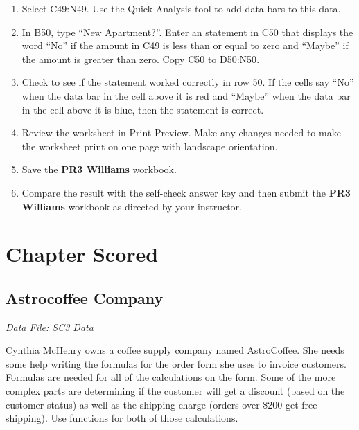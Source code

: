 \begin{enumerate}
	\item Select \textsf{C49:N49}. Use the Quick Analysis tool to add data bars to this data.
	\item In \textsf{B50}, type ``New Apartment?''. Enter an  statement in \textsf{C50} that displays the word ``No'' if the amount in \textsf{C49} is less than or equal to zero and ``Maybe'' if the amount is greater than zero. Copy \textsf{C50} to \textsf{D50:N50}.
	\item Check to see if the  statement worked correctly in row \textsf{50}. If the cells say ``No'' when the data bar in the cell above it is red and ``Maybe'' when the data bar in the cell above it is blue, then the  statement is correct.
	\item Review the worksheet in Print Preview. Make any changes needed to make the worksheet print on one page with landscape orientation.
	\item Save the \textbf{PR3 Williams} workbook.
	\item Compare the result with the self-check answer key and then submit the \textbf{PR3 Williams} workbook as directed by your instructor.
\end{enumerate}

\section{Chapter Scored}

\subsection{Astrocoffee Company}

\textit{Data File: SC3 Data}

Cynthia McHenry owns a coffee supply company named AstroCoffee. She needs some help writing the formulas for the order form she uses to invoice customers. Formulas are needed for all of the calculations on the form. Some of the more complex parts are determining if the customer will get a discount (based on the customer status) as well as the shipping charge (orders over \$200 get free shipping). Use  functions for both of those calculations.

